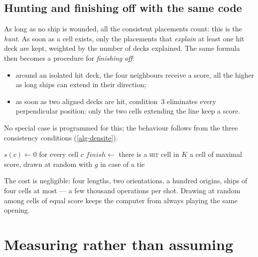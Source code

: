 \subsection{Hunting and finishing off with the same code}

As long as no ship is wounded, all the consistent placements count: this is the \emph{hunt}.
As soon as a  cell exists, only the placements that \emph{explain} at least one hit
deck are kept, weighted by the number of decks explained. The same formula then becomes a
procedure for \emph{finishing off}:

\begin{itemize}
    \item around an isolated hit deck, the four neighbours receive a score, all the higher
          as long ships can extend in their direction;
    \item as soon as two aligned decks are hit, condition~3 eliminates every perpendicular
          position: only the two cells extending the line keep a score.
\end{itemize}

No special case is programmed for this; the behaviour follows from the three consistency
conditions (\cref{alg-densite}).

\begin{algorithm}[ht]
    \caption{Choice of a target at the hard level}
    \label{alg-densite}
    $s(c) \gets 0$ for every cell $c$\;
    $\mathit{finish} \gets$ there is a \textsc{hit} cell in $K$\;
    \Return a cell of maximal score, drawn at random with $g$ in case of a tie\;
\end{algorithm}

The cost is negligible: four lengths, two orientations, a hundred origins, ships of four
cells at most --- a few thousand operations per shot. Drawing at random among cells of equal
score keeps the computer from always playing the same opening.

\section{Measuring rather than assuming}

